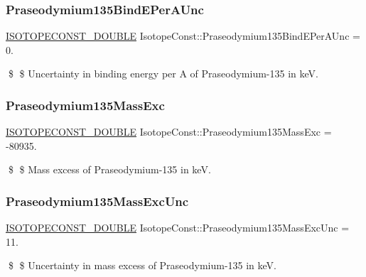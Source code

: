 \subsubsection{\texorpdfstring{Praseodymium135\+Bind\+E\+Per\+A\+Unc}{Praseodymium135BindEPerAUnc}}
{\footnotesize\ttfamily \mbox{\hyperlink{group___isotope_const-_macros_ga8f45a7272ce02c0b4c65c44636ed719a}{I\+S\+O\+T\+O\+P\+E\+C\+O\+N\+S\+T\+\_\+\+D\+O\+U\+B\+LE}} Isotope\+Const\+::\+Praseodymium135\+Bind\+E\+Per\+A\+Unc = 0.}

\$ \$ Uncertainty in binding energy per A of Praseodymium-\/135 in keV. \mbox{\label{group___isotope_const-_praseodymium-_pr135_gaf7851f1181ec77d8a818aac385375c9f}} 
\subsubsection{\texorpdfstring{Praseodymium135\+Mass\+Exc}{Praseodymium135MassExc}}
{\footnotesize\ttfamily \mbox{\hyperlink{group___isotope_const-_macros_ga8f45a7272ce02c0b4c65c44636ed719a}{I\+S\+O\+T\+O\+P\+E\+C\+O\+N\+S\+T\+\_\+\+D\+O\+U\+B\+LE}} Isotope\+Const\+::\+Praseodymium135\+Mass\+Exc = -\/80935.}

\$ \$ Mass excess of Praseodymium-\/135 in keV. \mbox{\label{group___isotope_const-_praseodymium-_pr135_gab3f0aa2563da3f1379eb7eed853de396}} 
\subsubsection{\texorpdfstring{Praseodymium135\+Mass\+Exc\+Unc}{Praseodymium135MassExcUnc}}
{\footnotesize\ttfamily \mbox{\hyperlink{group___isotope_const-_macros_ga8f45a7272ce02c0b4c65c44636ed719a}{I\+S\+O\+T\+O\+P\+E\+C\+O\+N\+S\+T\+\_\+\+D\+O\+U\+B\+LE}} Isotope\+Const\+::\+Praseodymium135\+Mass\+Exc\+Unc = 11.}

\$ \$ Uncertainty in mass excess of Praseodymium-\/135 in keV. \mbox{\label{group___isotope_const-_praseodymium-_pr135_gaaab2082f9aaf2632ffb153889139a5ac}} 
